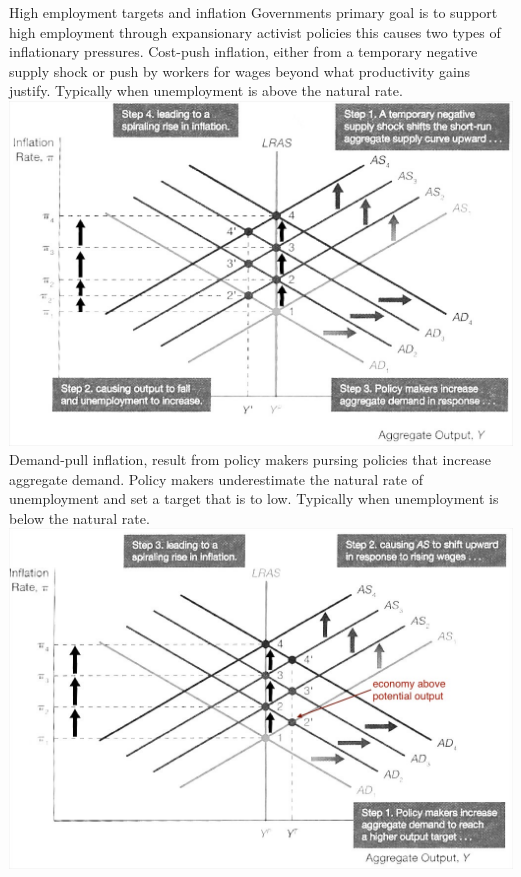 \documentclass[12pt]{examnotes}
\begin{document}
 High employment targets and inflation
\rna Governments primary goal is to support high employment through expansionary activist policies this causes two types of inflationary pressures.
\rna Cost-push inflation, either from a temporary negative supply shock or push by workers for wages beyond what productivity gains justify.
\rna Typically when unemployment is above the natural rate.
\includegraphics[scale=0.4]{./imgs/242.jpg}
\rna Demand-pull inflation, result from policy makers pursing policies that increase aggregate demand.
\rna Policy makers underestimate the natural rate of unemployment and set a target that is to low.
\rna Typically when unemployment is below the natural rate.
\vspace{6pt}
\includegraphics[scale=0.4]{./imgs/243.jpg}
\end{document}
